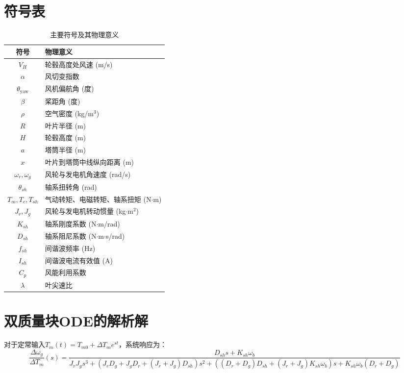 \documentclass[withoutpreface,bwprint]{cumcmthesis}
\begin{document}
\begin{appendices}

\section{符号表}
\begin{table}[!ht]
\centering
\caption{主要符号及其物理意义}
\label{app:symbols}
\begin{tabular}{cl}
\toprule
\textbf{符号} & \textbf{物理意义} \\
\midrule
$V_H$ & 轮毂高度处风速 (m/s) \\
$\alpha$ & 风切变指数 \\
$\theta_{\mathrm{yaw}}$ & 风机偏航角 (度) \\
$\beta$ & 桨距角 (度) \\
$\rho$ & 空气密度 (kg/m$^3$) \\
$R$ & 叶片半径 (m) \\
$H$ & 轮毂高度 (m) \\
$a$ & 塔筒半径 (m) \\
$x$ & 叶片到塔筒中线纵向距离 (m) \\
$\omega_r, \omega_g$ & 风轮与发电机角速度 (rad/s) \\
$\theta_{sh}$ & 轴系扭转角 (rad) \\
$T_m, T_e, T_{sh}$ & 气动转矩、电磁转矩、轴系扭矩 (N$\cdot$m) \\
$J_r, J_g$ & 风轮与发电机转动惯量 (kg$\cdot$m$^2$) \\
$K_{sh}$ & 轴系刚度系数 (N$\cdot$m/rad) \\
$D_{sh}$ & 轴系阻尼系数 (N$\cdot$m$\cdot$s/rad) \\
$f_{sh}$ & 间谐波频率 (Hz) \\
$I_{sh}$ & 间谐波电流有效值 (A) \\
$C_p$ & 风能利用系数 \\
$\lambda$ & 叶尖速比 \\
\bottomrule
\end{tabular}
\end{table}

\section{双质量块ODE的解析解}
对于定常输入$T_m(t)=T_{m0}+\Delta T_m e^{st}$，系统响应为：
\begin{equation}
\frac{\Delta\omega_g}{\Delta T_m}(s) = \frac{D_{sh}s + K_{sh}\omega_b}
{J_rJ_gs^3 + (J_rD_g+J_gD_r+(J_r+J_g)D_{sh})s^2 + ((D_r+D_g)D_{sh}+(J_r+J_g)K_{sh}\omega_b)s + K_{sh}\omega_b(D_r+D_g)}
\end{equation}


\end{appendices}
\end{document}
